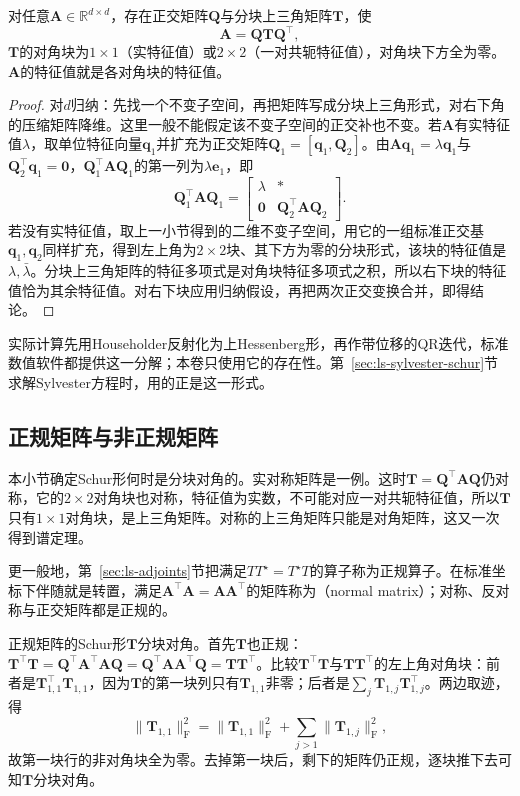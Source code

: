 \begin{theorem}[实Schur形]
\label{thm:ls-real-schur}
对任意$\bm A\in\mathbb R^{d\times d}$，存在正交矩阵$\bm Q$与分块上三角矩阵$\bm T$，使
\begin{equation}
 \bm A=\bm Q\bm T\bm Q^{\top},
 \label{eq:matrix-analysis-schur-decomposition}
\end{equation}
$\bm T$的对角块为$1\times1$（实特征值）或$2\times2$（一对共轭特征值），对角块下方全为零。$\bm A$的特征值就是各对角块的特征值。
\end{theorem}
\begin{proof}
对$d$归纳：先找一个不变子空间，再把矩阵写成分块上三角形式，对右下角的压缩矩阵降维。这里一般不能假定该不变子空间的正交补也不变。若$\bm A$有实特征值$\lambda$，取单位特征向量$\bm q_1$并扩充为正交矩阵$\bm Q_1=[\bm q_1,\bm Q_2]$。由$\bm A\bm q_1=\lambda\bm q_1$与$\bm Q_2^\top\bm q_1=\bm0$，$\bm Q_1^\top\bm A\bm Q_1$的第一列为$\lambda\bm e_1$，即
\[
 \bm Q_1^\top\bm A\bm Q_1=\begin{bmatrix}\lambda&*\\\bm0&\bm Q_2^\top\bm A\bm Q_2\end{bmatrix}.
\]
若没有实特征值，取上一小节得到的二维不变子空间，用它的一组标准正交基$\bm q_1,\bm q_2$同样扩充，得到左上角为$2\times2$块、其下方为零的分块形式，该块的特征值是$\lambda,\bar\lambda$。分块上三角矩阵的特征多项式是对角块特征多项式之积，所以右下块的特征值恰为其余特征值。对右下块应用归纳假设，再把两次正交变换合并，即得结论。
\end{proof}
实际计算先用Householder反射化为上Hessenberg形，再作带位移的QR迭代，标准数值软件都提供这一分解；本卷只使用它的存在性。第~\ref{sec:ls-sylvester-schur}节求解Sylvester方程时，用的正是这一形式。

\subsection{正规矩阵与非正规矩阵}

本小节确定Schur形何时是分块对角的。实对称矩阵是一例。这时$\bm T=\bm Q^\top\bm A\bm Q$仍对称，它的$2\times2$对角块也对称，特征值为实数，不可能对应一对共轭特征值，所以$\bm T$只有$1\times1$对角块，是上三角矩阵。对称的上三角矩阵只能是对角矩阵，这又一次得到谱定理。

更一般地，第~\ref{sec:ls-adjoints}节把满足$TT^\star=T^\star T$的算子称为正规算子。在标准坐标下伴随就是转置，满足$\bm A^\top\bm A=\bm A\bm A^\top$的矩阵称为（normal matrix）；对称、反对称与正交矩阵都是正规的。

正规矩阵的Schur形$\bm T$分块对角。首先$\bm T$也正规：$\bm T^\top\bm T=\bm Q^\top\bm A^\top\bm A\bm Q=\bm Q^\top\bm A\bm A^\top\bm Q=\bm T\bm T^\top$。比较$\bm T^\top\bm T$与$\bm T\bm T^\top$的左上角对角块：前者是$\bm T_{1,1}^\top\bm T_{1,1}$，因为$\bm T$的第一块列只有$\bm T_{1,1}$非零；后者是$\sum_j\bm T_{1,j}\bm T_{1,j}^\top$。两边取迹，得
\[
 \lVert\bm T_{1,1}\rVert_{\mathrm F}^2=\lVert\bm T_{1,1}\rVert_{\mathrm F}^2+\sum_{j>1}\lVert\bm T_{1,j}\rVert_{\mathrm F}^2 ,
\]
故第一块行的非对角块全为零。去掉第一块后，剩下的矩阵仍正规，逐块推下去可知$\bm T$分块对角。

